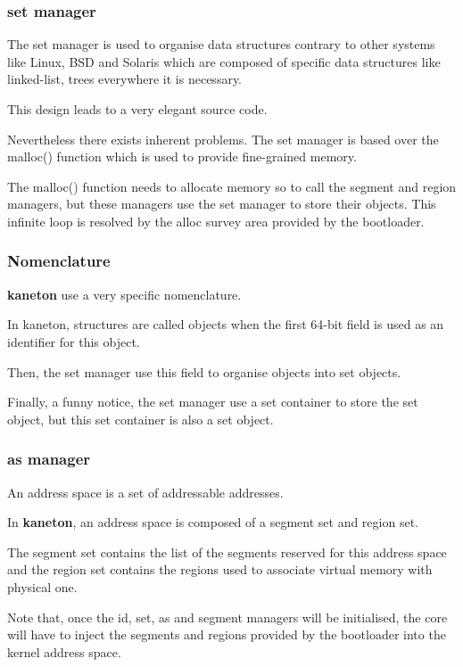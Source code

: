 
\begin{frame}
  \frametitle{set manager}

  The set manager is used to organise data structures contrary to other
  systems like Linux, BSD and Solaris which are composed of specific
  data structures like linked-list, trees everywhere it is necessary.

  \nl

  This design leads to a very elegant source code.

  \nl

  Nevertheless there exists inherent problems. The set manager is based
  over the malloc() function which is used to provide fine-grained memory.

  \nl

  The malloc() function needs to allocate memory so to call the segment
  and region managers, but these managers use the set manager to store their
  objects. This infinite loop is resolved by the alloc survey area provided
  by the bootloader.
\end{frame}


\begin{frame}
  \frametitle{Nomenclature}

  \textbf{kaneton} use a very specific nomenclature.

  \nl

  In kaneton, structures are called objects when the first 64-bit field
  is used as an identifier for this object.

  \nl

  Then, the set manager use this field to organise objects into set objects.

  \nl

  Finally, a funny notice, the set manager use a set container to store
  the set object, but this set container is also a set object.
\end{frame}


\begin{frame}
  \frametitle{as manager}

  An address space is a set of addressable addresses.

  \nl

  In \textbf{kaneton}, an address space is composed of a segment set and
  region set.

  \nl

  The segment set contains the list of the segments reserved
  for this address space and the region set contains the regions used
  to associate virtual memory with physical one.

  \nl

  Note that, once the id, set, as and segment managers will be initialised,
  the core will have to inject the segments and regions provided by the
  bootloader into the kernel address space.
\end{frame}

